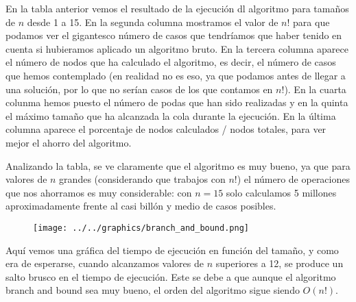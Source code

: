 \documentclass[11pt]{article}
\begin{document}
En la tabla anterior vemos el resultado de la ejecución dl algoritmo para tamaños de $n$ desde 1 a 15. En la segunda columna mostramos el valor de $n!$ para que podamos ver el gigantesco número de casos que tendríamos que haber tenido en cuenta si hubieramos aplicado un algoritmo bruto. En la tercera columna aparece el número de nodos que ha calculado el algoritmo, es decir, el número de casos que hemos contemplado (en realidad no es eso, ya que podamos antes de llegar a una solución, por lo que no serían casos de los que contamos en $n!$). En la cuarta colunma hemos puesto el número de podas que han sido realizadas y en la quinta el máximo tamaño que ha alcanzada la cola durante la ejecución. En la última columna aparece el porcentaje de nodos calculados / nodos totales, para ver mejor el ahorro del algoritmo.

Analizando la tabla, se ve claramente que el algoritmo es muy bueno, ya que para valores de $n$ grandes (considerando que trabajos con $n!$) el número de operaciones que nos ahorramos es muy considerable: con $n=15$ solo calculamos 5 millones aproximadamente frente al casi billón y medio de casos posibles.
\newpage
\begin{figure}[hb]
\centering
\texttt{[image: ../../graphics/branch\_and\_bound.png]}
\end{figure}

Aquí vemos una gráfica del tiempo de ejecución en función del tamaño, y como era de esperarse, cuando alcanzamos valores de $n$ superiores a 12, se produce un salto brusco en el tiempo de ejecución. Este se debe a que aunque el algoritmo branch and bound sea muy bueno, el orden del algoritmo sigue siendo $O(n!)$.
\end{document}
